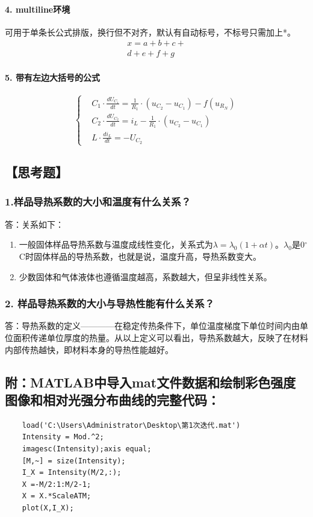 \documentclass[12pt,a4paper,UTF8]{ctexart}
\begin{document}
	\paragraph*{4. multiline环境}可用于单条长公式排版，换行但不对齐，默认有自动标号，不标号只需加上*。
		\begin{multline}
		x = a+b+c+{} \\
		d+e+f+g
		\end{multline}

	\paragraph*{5. 带有左边大括号的公式}
	\[\left\{%
		\begin{aligned}
		&C_{1} \cdot \frac{d U_{C_{1}}}{d t}=\frac{1}{R_{1}} \cdot(u_{C_{2}}-u_{C_{1}})-f(u_{R_{N}}) \\
		&C_{2} \cdot \frac{d U_{C_{2}}}{d t}=i_{L}-\frac{1}{R_{1}} \cdot(u_{C_{2}}-u_{C_{1}}) \\
		&L \cdot \frac{d i_{L}}{d t}=-U_{C_{2}}
		\end{aligned}
	   \right.
	\]



\subsection*{【思考题】}

	\subsubsection*{1.样品导热系数的大小和温度有什么关系？}
	答：关系如下：
	\begin{enumerate}[(1)]
			\item 一般固体样品导热系数与温度成线性变化，关系式为$\lambda=\lambda_0(1+\alpha t)$。$\lambda_0$是0$^{\circ}$C时固体样品的导热系数，也就是说，温度升高，导热系数变大。
			\item 少数固体和气体液体也遵循温度越高，系数越大，但呈非线性关系。
	\end{enumerate}

	\subsubsection*{2. 样品导热系数的大小与导热性能有什么关系？}
	答：导热系数的定义————在稳定传热条件下，单位温度梯度下单位时间内由单位面积传递单位厚度的热量。从以上定义可以看出，导热系数越大，反映了在材料内部传热越快，即材料本身的导热性能越好。


\newpage %
\subsection*{附：MATLAB中导入mat文件数据和绘制彩色强度图像和相对光强分布曲线的完整代码：}

	\begin{lstlisting}
	load('C:\Users\Administrator\Desktop\第1次迭代.mat')
	Intensity = Mod.^2;
	imagesc(Intensity);axis equal;
	[M,~] = size(Intensity);
	I_X = Intensity(M/2,:);
	X =-M/2:1:M/2-1;
	X = X.*ScaleATM;
	plot(X,I_X);
	\end{lstlisting}
\end{document}
